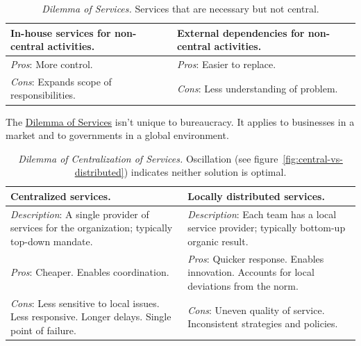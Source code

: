 \begin{center}
\begin{table}[H] %
\begin{tabular}{ | m{\dilemmatablewidth}| m{\dilemmatablewidth} | } 
  \hline
  \textbf{In-house services for non-central activities.} &
  \textbf{External dependencies for non-central activities.} \\
  \hline
  \textit{Pros}: More control. &
  \textit{Pros}: Easier to replace. \\
  \hline
  \textit{Cons}: Expands scope of responsibilities. & 
  \textit{Cons}: Less understanding of problem.  \\
  \hline
\end{tabular}
\caption{
\textit{Dilemma of Services.}
Services that are necessary but not central.
}
\label{table:inhouse-vs-external}
\end{table}
\end{center}

The \href{table:inhouse-vs-external}{Dilemma of Services} isn't unique to bureaucracy. It applies to businesses in a market and to governments in a global environment. 




\begin{center}
\begin{table}[H] %
\begin{tabular}{ | m{\dilemmatablewidth}| m{\dilemmatablewidth} | } 
  \hline
  \textbf{Centralized services.} &
  \textbf{Locally distributed services.} \\
  \hline
  \textit{Description}: A single provider of services for the organization; typically top-down mandate. &
  \textit{Description}: Each team has a local service provider; typically bottom-up organic result. \\  
  \hline
  \textit{Pros}: Cheaper. Enables coordination. &
  \textit{Pros}: Quicker response. 
  Enables innovation. 
  Accounts for local deviations from the norm. \\
  \hline
  \textit{Cons}: Less sensitive to local issues. Less responsive. Longer delays. Single point of failure.  & 
  \textit{Cons}: Uneven quality of service. Inconsistent strategies and policies. \\
  \hline
\end{tabular}
\caption{
\textit{Dilemma of Centralization of Services.}
Oscillation (see figure~\ref{fig:central-vs-distributed}) indicates neither solution is optimal.
}
\label{table:central-vs-distributed}
\end{table}
\end{center}

